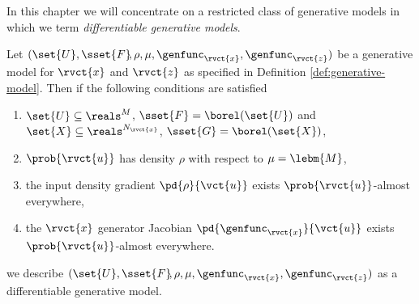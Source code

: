 
In this chapter we will concentrate on a restricted class of generative models in which we term \emph{differentiable generative models}.

\begin{definition}\label{def:differentiable-generative-model}
Let $(\set{U},\sset{F}\kern-2pt,\rho,\mu,\genfunc_{\rvct{x}},\genfunc_{\rvct{z}})$ be a generative model for $\rvct{x}$ and $\rvct{z}$ as specified in Definition \ref{def:generative-model}. Then if the following conditions are satisfied
\begin{enumerate}
\item
$\set{U} \subseteq \reals^M$, $\sset{F} = \borel(\set{U})$ and $\set{X} \subseteq \reals^{N_{\rvct{x}}}$, $\sset{G} = \borel(\set{X})$, %
\item
$\prob{\rvct{u}}$ has density $\rho$ with respect to $\mu = \lebm{M}$, 
\item
the input density gradient $\pd{\rho}{\vct{u}}$ exists $\prob{\rvct{u}}$-almost everywhere, 
\item
the $\rvct{x}$ generator Jacobian $\pd{\genfunc_{\rvct{x}}}{\vct{u}}$ exists $\prob{\rvct{u}}$-almost everywhere.
\end{enumerate}
we describe $(\set{U},\sset{F}\kern-2pt,\rho,\mu,\genfunc_{\rvct{x}},\genfunc_{\rvct{z}})$ as a differentiable generative model.
\end{definition}


